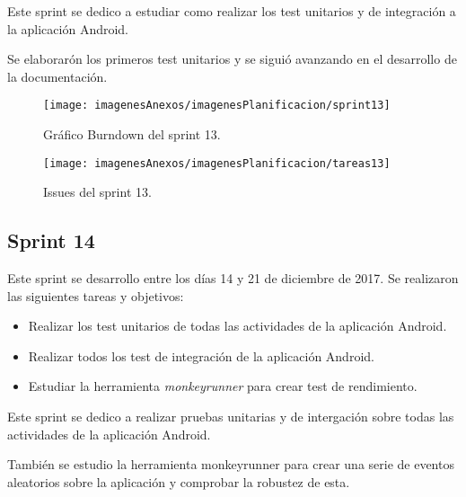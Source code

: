 Este sprint se dedico a estudiar como realizar los test unitarios y de integración a la aplicación Android.

Se elaborarón los primeros test unitarios y se siguió avanzando en el desarrollo de la documentación.

\begin{figure}[h]
    \begin{center}%
        \begin{center}%
          \texttt{[image: imagenesAnexos/imagenesPlanificacion/sprint13]}%
          \caption{Gráfico Burndown del sprint 13.}%
          \label{figSprint13}%
        \end{center}%
  	\end{center}%
\end{figure}%

\begin{figure}[h]
    \begin{center}%
        \begin{center}%
          \texttt{[image: imagenesAnexos/imagenesPlanificacion/tareas13]}%
          \caption{Issues del sprint 13.}%
          \label{figTareas13}%
        \end{center}%
  	\end{center}%
\end{figure}%

\newpage

\subsection{Sprint 14}

Este sprint se desarrollo entre los días 14 y 21 de diciembre de 2017. Se realizaron las siguientes tareas y objetivos:

\begin{itemize}
	\item Realizar los test unitarios de todas las actividades de la aplicación Android.
	\item Realizar todos los test de integración de la aplicación Android.
	\item Estudiar la herramienta \textit{monkeyrunner} para crear test de rendimiento.
\end{itemize}

Este sprint se dedico a realizar pruebas unitarias y de intergación sobre todas las actividades de la aplicación Android.

También se estudio la herramienta monkeyrunner para crear una serie de eventos aleatorios sobre la aplicación y comprobar la robustez de esta.

